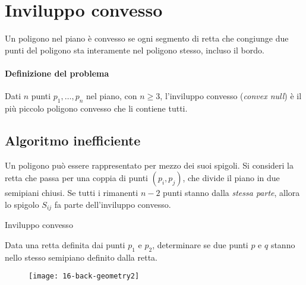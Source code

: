 \newpage
\section{Inviluppo convesso}

\begin{definition}
Un poligono nel piano è \alert{convesso} se ogni segmento di retta che congiunge due punti del poligono sta interamente nel poligono stesso, incluso il bordo.
\end{definition}

\paragraph{Definizione del problema}
Dati \(n\) punti \(p_1, \dots, p_n\) nel piano, con \(n \geqslant 3\), l'\alert{inviluppo convesso} (\emph{convex null}) è il più piccolo poligono convesso che li contiene tutti.

\subsection{Algoritmo inefficiente}

Un poligono può essere rappresentato per mezzo dei suoi spigoli.
Si consideri la retta che passa per una coppia di punti \((p_i, p_j)\), che divide il piano in due semipiani chiusi.
Se tutti i rimanenti \(n-2\) punti stanno dalla \emph{stessa parte}, allora lo spigolo \(S_{ij}\) fa parte dell'inviluppo convesso.

\begin{algorithm}[H]
\caption{Inviluppo convesso}

Data una retta definita dai punti \(p_1\) e \(p_2\), determinare se due punti \(p\) e \(q\) stanno nello stesso semipiano definito dalla retta.

\begin{figure}[H]
	\centering
	\texttt{[image: 16-back-geometry2]}
\end{figure}


\end{algorithm}

